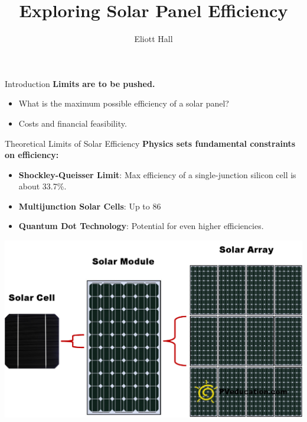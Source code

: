 \documentclass[aspectratio=169]{beamer} %
\title{Exploring Solar Panel Efficiency}
\author{Eliott Hall}
\date{} %
\begin{document}
\frame{\titlepage}

\begin{frame}{Introduction}
    \textbf{Limits are to be pushed.}
    \begin{itemize}
        \item What is the maximum possible efficiency of a solar panel?
        \item Costs and financial feasibility.
    \end{itemize}
\end{frame}

\begin{frame}{Theoretical Limits of Solar Efficiency}
    \textbf{Physics sets fundamental constraints on efficiency:}
    \begin{itemize}
        \item \textbf{Shockley-Queisser Limit}: Max efficiency of a single-junction silicon cell is about 33.7\%.
        \item \textbf{Multijunction Solar Cells}: Up to 86%
        \item \textbf{Quantum Dot Technology}: Potential for even higher efficiencies.
    \end{itemize}
    \centering
    \includegraphics[width=0.7\linewidth]{solar_cells.png} %
\end{frame}
\end{document}
